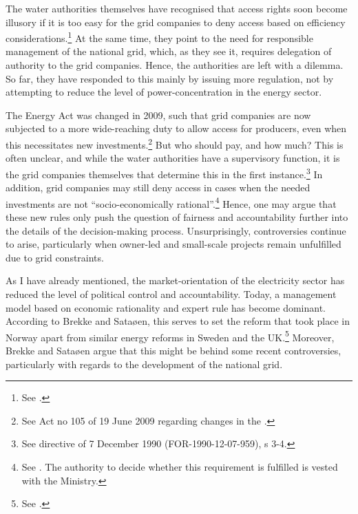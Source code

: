 The water authorities themselves have recognised that access rights soon become illusory if it is too easy for the grid companies to deny access based on efficiency considerations.\footnote{See \cite{otprp62}.} At the same time, they point to the need for responsible management of the national grid, which, as they see it, requires delegation of authority to the grid companies. Hence, the authorities are left with a dilemma. So far, they have responded to this mainly by issuing more regulation, not by attempting to reduce the level of power-concentration in the energy sector.

The Energy Act was changed in 2009, such that grid companies are now subjected to a more wide-reaching duty to allow access for producers, even when this necessitates new investments.\footnote{See Act no 105 of 19 June 2009 regarding changes in the \cite{ea90}.} But who should pay, and how much? This is often unclear, and while the water authorities have a supervisory function, it is the grid companies themselves that determine this in the first instance.\footnote{See directive of 7 December 1990 (FOR-1990-12-07-959), s 3-4.} In addition, grid companies may still deny access in cases when the needed investments are not ``socio-economically rational''.\footnote{See \cite[3-4]{ea90}. The authority to decide whether this requirement is fulfilled is vested with the Ministry.} Hence, one may argue that these new rules only push the question of fairness and accountability further into the details of the decision-making process. Unsurprisingly, controversies continue to arise, particularly when owner-led and small-scale projects remain unfulfilled due to grid constraints.


As I have already mentioned, the market-orientation of the electricity sector has reduced the level of political control and accountability. Today, a management model based on economic rationality and expert rule has become dominant. According to Brekke and Sataøen, this serves to set the reform that took place in Norway apart from similar energy reforms in Sweden and the UK.\footnote{See \cite{brekke12}.} Moreover, Brekke and Sataøen argue that this might be behind some recent controversies, particularly with regards to the development of the national grid. 

